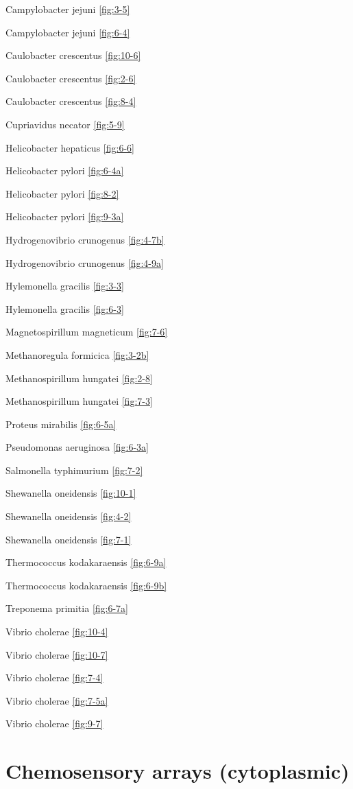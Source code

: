 \documentclass[]{tufte-book}
\begin{document}
Campylobacter jejuni \ref{fig:3-5}

Campylobacter jejuni \ref{fig:6-4}

Caulobacter crescentus \ref{fig:10-6}

Caulobacter crescentus \ref{fig:2-6}

Caulobacter crescentus \ref{fig:8-4}

Cupriavidus necator \ref{fig:5-9}

Helicobacter hepaticus \ref{fig:6-6}

Helicobacter pylori \ref{fig:6-4a}

Helicobacter pylori \ref{fig:8-2}

Helicobacter pylori \ref{fig:9-3a}

Hydrogenovibrio crunogenus \ref{fig:4-7b}

Hydrogenovibrio crunogenus \ref{fig:4-9a}

Hylemonella gracilis \ref{fig:3-3}

Hylemonella gracilis \ref{fig:6-3}

Magnetospirillum magneticum \ref{fig:7-6}

Methanoregula formicica \ref{fig:3-2b}

Methanospirillum hungatei \ref{fig:2-8}

Methanospirillum hungatei \ref{fig:7-3}

Proteus mirabilis \ref{fig:6-5a}

Pseudomonas aeruginosa \ref{fig:6-3a}

Salmonella typhimurium \ref{fig:7-2}

Shewanella oneidensis \ref{fig:10-1}

Shewanella oneidensis \ref{fig:4-2}

Shewanella oneidensis \ref{fig:7-1}

Thermococcus kodakaraensis \ref{fig:6-9a}

Thermococcus kodakaraensis \ref{fig:6-9b}

Treponema primitia \ref{fig:6-7a}

Vibrio cholerae \ref{fig:10-4}

Vibrio cholerae \ref{fig:10-7}

Vibrio cholerae \ref{fig:7-4}

Vibrio cholerae \ref{fig:7-5a}

Vibrio cholerae \ref{fig:9-7}

\section*{Chemosensory arrays
(cytoplasmic)}\label{chemosensory-arrays-cytoplasmic}
\end{document}
